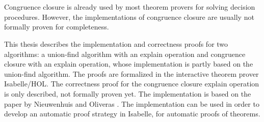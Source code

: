 \chapter{\abstractname}


Congruence closure is already used by most theorem provers for solving decision procedures.  However, the implementations of congruence closure are usually not formally proven for completeness.

This thesis describes the implementation and correctness proofs for two algorithms: a union-find algorithm with an explain operation and congruence closure with an explain operation, whose implementation is partly based on the union-find algorithm. The proofs are formalized in the interactive theorem prover Isabelle/HOL. The correctness proof for the congruence closure explain operation is only described, not formally proven yet. The implementation is based on the paper by Nieuwenhuis and Oliveras \cite{Nieuwenhuis}. The implementation can be used in order to develop an automatic proof strategy in Isabelle, for automatic proofs of theorems.